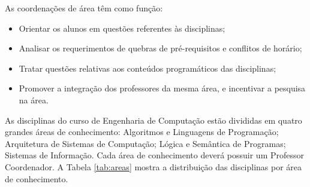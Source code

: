 As coordenações de área têm como função:

\begin{itemize}
    \item Orientar os alunos em questões referentes às disciplinas;
    \item Analisar os requerimentos de quebras de pré-requisitos e conflitos de horário;
    \item Tratar questões relativas aos conteúdos programáticos das disciplinas;
    \item Promover a integração dos professores da mesma área, e incentivar a pesquisa na área.
\end{itemize}

As disciplinas do curso de Engenharia de Computação estão divididas em quatro grandes áreas de conhecimento: Algoritmos e Linguagens de Programação; Arquitetura de Sistemas de Computação; Lógica e Semântica de Programas; Sistemas de Informação. Cada área de conhecimento deverá possuir um Professor Coordenador. A Tabela \ref{tab:areas} mostra a distribuição das disciplinas por área de conhecimento.

